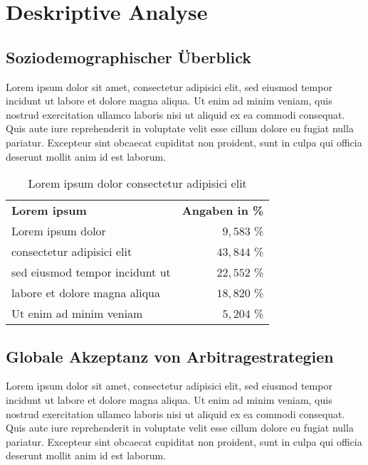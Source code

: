 \documentclass[12pt, a4paper, oneside]{article}
\begin{document}
\section{Deskriptive Analyse}
\subsection{Soziodemographischer Überblick}
Lorem ipsum dolor sit amet, consectetur adipisici elit, sed eiusmod tempor incidunt ut labore et dolore magna aliqua. Ut enim ad minim veniam, quis nostrud exercitation ullamco laboris nisi ut aliquid ex ea commodi consequat. Quis aute iure reprehenderit in voluptate velit esse cillum dolore eu fugiat nulla pariatur. Excepteur sint obcaecat cupiditat non proident, sunt in culpa qui officia deserunt mollit anim id est laborum.

\begin{table}[!ht]
     \centering
     \begin{tabular}{lr}
       \textbf{Lorem ipsum}  & \textbf{Angaben in \%}\\
       Lorem ipsum dolor            & $9{,}583 $ \%             \\
       consectetur adipisici elit       & $43{,}844 $ \%             \\
       sed eiusmod tempor incidunt ut  & $22{,}552 $ \%             \\
       labore et dolore magna aliqua &  $18{,}820 $ \%           \\
       Ut enim ad minim veniam & $5{,}204 $ \%\\
     \end{tabular}

     \caption{Lorem ipsum dolor consectetur adipisici elit}
     \label{tbl:Tabelle 2}

   \end{table}
   

\subsection{Globale Akzeptanz von Arbitragestrategien}
Lorem ipsum dolor sit amet, consectetur adipisici elit, sed eiusmod tempor incidunt ut labore et dolore magna aliqua. Ut enim ad minim veniam, quis nostrud exercitation ullamco laboris nisi ut aliquid ex ea commodi consequat. Quis aute iure reprehenderit in voluptate velit esse cillum dolore eu fugiat nulla pariatur. Excepteur sint obcaecat cupiditat non proident, sunt in culpa qui officia deserunt mollit anim id est laborum.
\end{document}
